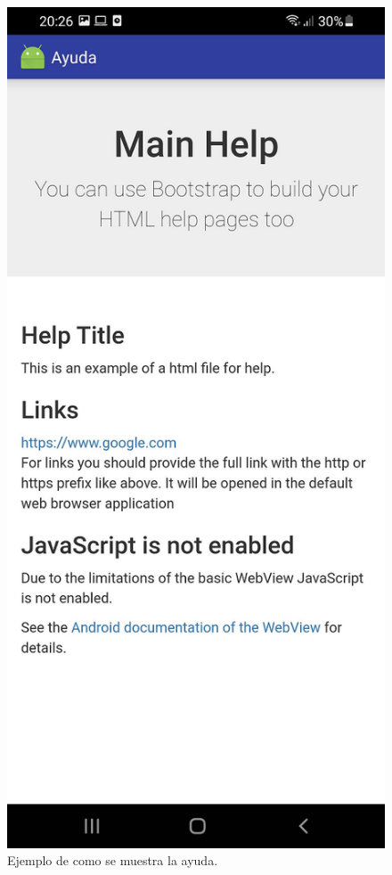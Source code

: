 \begin{figure}[H]
  \centering
    \includegraphics[scale=0.3]{50-anexos/B-uso/ayuda_ejemplo.png} 
    \caption{Ejemplo de como se muestra la ayuda.}
\end{figure}	
		

